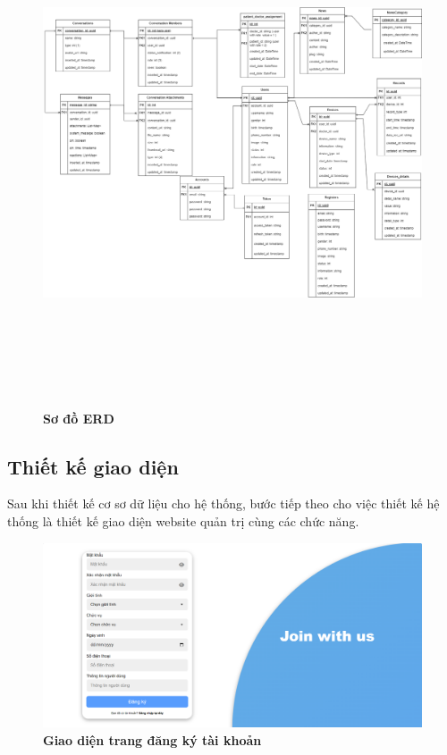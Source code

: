 \begin{figure}[H]
  \centering
  \includegraphics[width=15cm,height=15cm]{Images/system/fmECG_database.png}
  \caption[Sơ đồ ERD]{\bfseries \fontsize{12pt}{0pt}\selectfont Sơ đồ ERD}
  \label{fmECG_architecture-Database} %
\end{figure}

\subsection{Thiết kế giao diện}

Sau khi thiết kế cơ sơ dữ liệu cho hệ thống, bước tiếp theo cho việc thiết kế hệ thống là thiết kế giao diện website quản trị cùng các chức năng. 
\begin{figure}[H]
  \centering
  \includegraphics[scale=0.4]{Images/server/webUI/register_2.png}
  \caption[Giao diện trang đăng ký tài khoản]{\bfseries \fontsize{12pt}{0pt}\selectfont Giao diện trang đăng ký tài khoản}
  \label{register_2} %
\end{figure}

